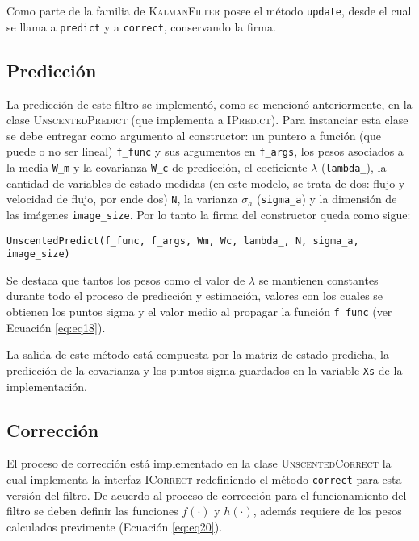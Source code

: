 Como parte de la familia de \textsc{KalmanFilter} posee el m\'etodo \texttt{update}, desde el cual se llama a \texttt{predict} y a \texttt{correct}, conservando la firma.
 
\subsection{Predicci\'on}
La predicci\'on de este filtro se implement\'o, como se mencion\'o anteriormente, en la clase \textsc{UnscentedPredict} (que implementa a \textsc{IPredict}). Para instanciar esta clase se debe entregar como argumento al constructor: un puntero a funci\'on (que puede o no ser lineal) \texttt{f\_func} y sus argumentos en \texttt{f\_args}, los pesos asociados a la media \texttt{W\_m} y la covarianza \texttt{W\_c} de predicci\'on, el coeficiente $\lambda$ (\texttt{lambda\_}), la cantidad de variables de estado medidas (en este modelo, se trata de dos: flujo y velocidad de 
flujo, por ende dos) \texttt{N}, la varianza $\sigma_a$ (\texttt{sigma\_a}) y la dimensi\'on de las im\'agenes \texttt{image\_size}. Por lo tanto la firma del constructor queda como sigue:
\bigskip
\begin{center}
\texttt{UnscentedPredict(f\_func, f\_args, Wm, Wc, lambda\_, N, sigma\_a, image\_size)}
\end{center}
\bigskip

Se destaca que tantos los pesos como el valor de $\lambda$ se mantienen constantes durante todo el proceso de predicci\'on y estimaci\'on, valores con los cuales se obtienen los puntos sigma y el valor medio al propagar la funci\'on \texttt{f\_func} (ver Ecuaci\'on \ref{eq:eq18}).
\bigskip

La salida de este m\'etodo est\'a compuesta por la matriz de estado predicha, la predicci\'on de la covarianza y los puntos sigma guardados en la variable \texttt{Xs} de la implementaci\'on.

\subsection{Correcci\'on}
El proceso de correcci\'on est\'a implementado en la clase \textsc{UnscentedCorrect} la cual implementa la interfaz \textsc{ICorrect} redefiniendo el m\'etodo \texttt{correct} para esta versi\'on del filtro. De acuerdo al proceso de correcci\'on para el funcionamiento del filtro se deben definir las funciones $f(\cdot)$ y $h(\cdot)$, adem\'as requiere de los pesos calculados previmente (Ecuaci\'on \ref{eq:eq20}).
\bigskip

